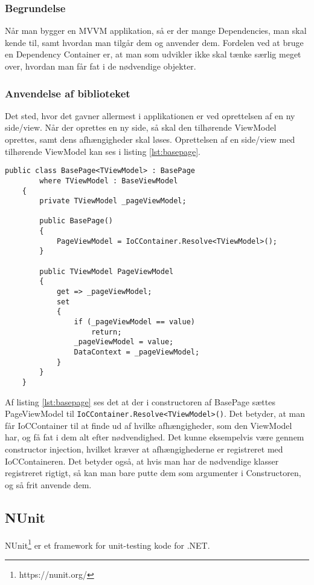 \documentclass[Implementering/Implementering_main.tex]{subfiles}
\begin{document}
\subsubsection{Begrundelse}
Når man bygger en MVVM applikation, så er der mange Dependencies, man skal kende til, samt hvordan man tilgår dem og anvender dem. Fordelen ved at bruge en Dependency Container er, at man som udvikler ikke skal tænke særlig meget over, hvordan man får fat i de nødvendige objekter. 

\subsubsection{Anvendelse af biblioteket}
Det sted, hvor det gavner allermest i applikationen er ved oprettelsen af en ny side/view. Når der oprettes en ny side, så skal den tilhørende ViewModel oprettes, samt dens afhængigheder skal løses. Oprettelsen af en side/view med tilhørende ViewModel kan ses i listing \ref{lst:basepage}.

\begin{lstlisting}[caption={Oprettelse af en side med tilhørende ViewModel}, label={lst:basepage},
style=customc]
 public class BasePage<TViewModel> : BasePage
        where TViewModel : BaseViewModel
    {
        private TViewModel _pageViewModel;

        public BasePage()
        {
            PageViewModel = IoCContainer.Resolve<TViewModel>();
        }

        public TViewModel PageViewModel
        {
            get => _pageViewModel;
            set
            {
                if (_pageViewModel == value)
                    return;
                _pageViewModel = value;
                DataContext = _pageViewModel;
            }
        }
    }
\end{lstlisting}

Af listing \ref{lst:basepage} ses det at der i constructoren af BasePage sættes PageViewModel til \lstinline{IoCContainer.Resolve<TViewModel>()}. Det betyder, at man får IoCContainer til at finde ud af hvilke afhængigheder, som den ViewModel har, og få fat i dem alt efter nødvendighed. Det kunne eksempelvis være gennem constructor injection, hvilket kræver at afhængighederne er registreret med IoCContaineren. Det betyder også, at hvis man har de nødvendige klasser registreret rigtigt, så kan man bare putte dem som argumenter i Constructoren, og så frit anvende dem.

\subsection{NUnit}
NUnit\footnote{https://nunit.org/} er et framework for unit-testing kode for .NET. 
\end{document}

